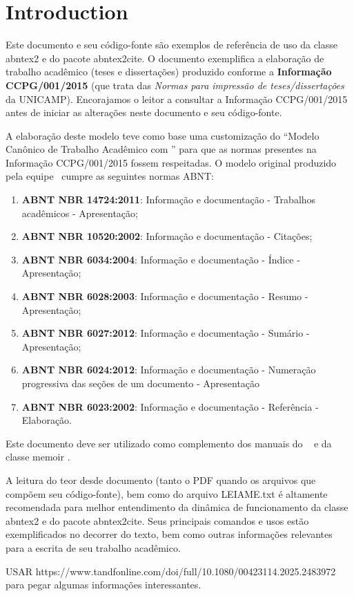 \chapter[Introduction]{Introduction}

Este documento e seu código-fonte são exemplos de referência de uso da classe
\textsf{abntex2} e do pacote \textsf{abntex2cite}. O documento exemplifica a elaboração 
de trabalho acadêmico (teses e dissertações) produzido conforme a \textbf{Informação 
CCPG/001/2015} (que trata das \emph{Normas para impressão de teses/dissertações} da 
UNICAMP). Encorajamos o leitor a consultar a Informação CCPG/001/2015 \cite{CCPG:001:2015}
antes de iniciar as alterações neste documento e seu código-fonte.

A elaboração deste modelo teve como base uma customização do ``Modelo Canônico de
Trabalho Acadêmico com \abnTeX'' \cite{abntex2modelo} para que as normas presentes na
Informação CCPG/001/2015 fossem respeitadas. O modelo original produzido pela equipe 
\abnTeX\ cumpre as seguintes normas ABNT:
\begin{enumerate}
 \item \textbf{ABNT NBR 14724:2011}: Informação e documentação - Trabalhos 
    acadêmicos - Apresentação;
 \item \textbf{ABNT NBR 10520:2002}: Informação e documentação - Citações;
 \item \textbf{ABNT NBR 6034:2004}: Informação e documentação - Índice - Apresentação;
 \item \textbf{ABNT NBR 6028:2003}: Informação e documentação - Resumo - Apresentação;
 \item \textbf{ABNT NBR 6027:2012}: Informação e documentação - Sumário - Apresentação;
 \item \textbf{ABNT NBR 6024:2012}: Informação e documentação - Numeração progressiva 
    das seções de um documento - Apresentação
 \item \textbf{ABNT NBR 6023:2002}: Informação e documentação - Referência - Elaboração.
\end{enumerate}

Este documento deve ser utilizado como complemento dos manuais do \abnTeX\ 
\cite{abntex2classe,abntex2cite,abntex2cite-alf} e da classe \textsf{memoir} \cite{memoir}.

A leitura do teor desde documento (tanto o PDF quando os arquivos que compõem seu código-fonte),
bem como do arquivo \textsf{LEIAME.txt} é altamente recomendada para melhor entendimento da 
dinâmica de funcionamento da classe \textsf{abntex2} e do pacote \textsf{abntex2cite}. Seus
principais comandos e usos estão exemplificados no decorrer do texto, bem como outras informações
relevantes para a escrita de seu trabalho acadêmico.

USAR https://www.tandfonline.com/doi/full/10.1080/00423114.2025.2483972 para pegar algumas informações interessantes.